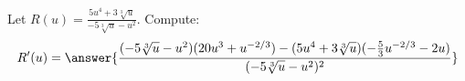 \documentclass{ximera}
\begin{document}
\begin{exercise}
Let $R(u) = \frac{ 5 u^4+3 \sqrt[3]{u}}{-5 \sqrt[3]{u}-u^2}$. Compute:
\[
R'(u)
=\answer{ \frac{(-5 \sqrt[3]{u}-u^2)(20u^3+u^{-2/3})-(5 u^4+3 \sqrt[3]{u})(-\frac{5}{3}u^{-2/3}-2u)}{(-5 \sqrt[3]{u}-u^2)^2}   }
\]
\end{exercise}
\end{document}
